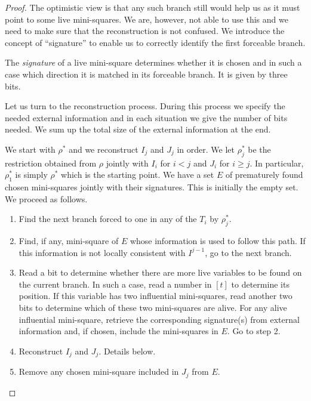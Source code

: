 \documentclass{article}\usepackage[a4paper,margin=20mm]{geometry}
\begin{document}
\begin{proof}
The optimistic view is that any such branch still would help
us as it must point to some live mini-squares.  We are,
however, not able to use this and we need to
make sure that the reconstruction is not confused.
We introduce the concept of ``signature'' to enable
us to correctly identify the first forceable branch.

\begin{definition}
The {\em signature} of a live mini-square determines whether
it is chosen and in such a case which direction
it is matched in its forceable branch.  It is given by
three bits.
\end{definition}

Let us turn to the reconstruction process. 
During this process we specify the needed external information
and in each situation we give the number of bits needed.
We sum up the total size of the external information
at the end.

We start with $\rho^*$ and we reconstruct
$I_j$ and $J_j$ in order.  We let $\rho_j^*$ be
the restriction obtained from $\rho$ jointly
with $I_i$ for $i < j$ and $J_i$ for $i \geq j$.
In particular, $\rho^*_1$ is simply $\rho^*$ which
is the starting point.
We have a set $E$ of prematurely found chosen mini-squares
jointly with their signatures.  This is initially the
empty set.  We proceed as follows.

\begin{enumerate}

\item Find the next branch forced to one in any
of the $T_i$ by $\rho_j^*$.

\item Find, if any, mini-square of $E$ whose information
is used to follow this path.  If this information is
not locally consistent with $I^{j-1}$, go
to the next branch.

\item Read a bit to determine whether there are more
live variables to be found on the current branch.
In such a case, read a number in $[t]$ to
determine its position.  If this variable has two
influential mini-squares, read another two bits
to determine which of these two mini-squares are alive.
For any alive influential mini-square, retrieve the corresponding 
signature(s) from external information
and, if chosen, include the mini-squares in $E$.
Go to step 2.

\item Reconstruct $I_j$ and $J_j$.  Details below.

\item Remove any chosen mini-square included in $J_j$ from $E$.


\end{enumerate}
\end{proof}
\end{document}
